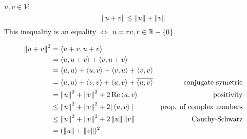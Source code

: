 \setcounter{thm}{13}
\begin{thm}
  $u,v \in V:$
  \begin{equation}
    \norm{u+v} \leq \norm{u} + \norm{v}
  \end{equation}
  This inequality is an equality $\iff$ $u=rv, r\in \real - \{0\}$.
\end{thm}
\begin{prf}
  \begin{equation}
    \begin{aligned}
      \norm{u+v}^2 
      &=    \ip{u+v}{u+v} & \\
      &=    \ip{u}{u+v}+\ip{v}{u+v} & \\
      &=    \ip{u}{u}+\ip{u}{v}+\ip{v}{u}+\ip{v}{v} & \\
      &=    \ip{u}{u}+\ip{v}{v}+\ip{u}{v}+\overline{\ip{u}{v}} & \text{conjugate symetrie}\\
      &=    \norm{u}^2+\norm{v}^2+2\operatorname{Re} \ip{u}{v} & \text{positivity}\\
      &\leq \norm{u}^2+\norm{v}^2+2|\ip{u}{v}| & \text{prop. of complex numbers} \\
      &\leq \norm{u}^2+\norm{v}^2+2\norm{u}\norm{v} & \text{Cauchy-Schwarz} \\
      &=    (\norm{u} + \norm{v})^2 &
    \end{aligned}   
  \end{equation}
\end{prf}
